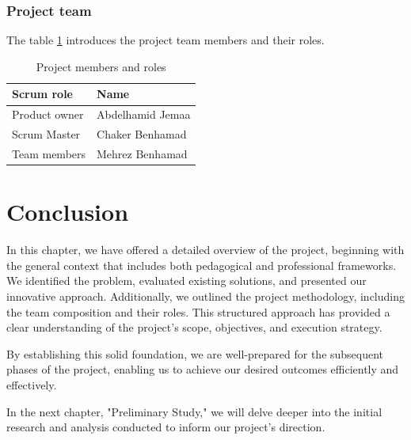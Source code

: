 \vspace{1cm}
\subsubsection{Project team}
The table \hyperref[p]{\ref{p}} introduces the project team members and their roles.

\begin{table}[!htbp]
\centering
  \begin{tabular}{ | p{3cm}  | p{6cm} |}
    \hline

    Scrum role    & Name          \\ \hline

    Product owner & Abdelhamid Jemaa  \\ \hline
    Scrum Master  & Chaker Benhamad   \\ \hline
    Team members  & Mehrez Benhamad \\ \hline

    \hline
  \end{tabular}
\caption{Project members and roles}
\label{p}
\end{table}

\section*{Conclusion}
In this chapter, we have offered a detailed overview of the project, beginning with the general context that includes both pedagogical and professional frameworks. We identified the problem, evaluated existing solutions, and presented our innovative approach. Additionally, we outlined the project methodology, including the team composition and their roles. This structured approach has provided a clear understanding of the project's scope, objectives, and execution strategy.

By establishing this solid foundation, we are well-prepared for the subsequent phases of the project, enabling us to achieve our desired outcomes efficiently and effectively.

In the next chapter, "Preliminary Study," we will delve deeper into the initial research and analysis conducted to inform our project's direction.